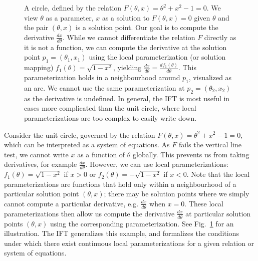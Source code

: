 \documentclass[11pt]{article}
\begin{document}
\begin{figure}
\centering
{}
\caption{
\label{fig:circle}
A circle, defined by the relation $F(\theta,x) = \theta^2 + x^2 - 1 = 0$.
We view $\theta$ as a parameter, $x$ as a solution to $F(\theta,x)=0$ given $\theta$
and the pair $(\theta,x)$ is a solution point.
Our goal is to compute the derivative $\frac{dx}{d\theta}$.
While we cannot differentiate the relation $F$ directly as it is not a function,
we can compute the derivative at the solution point $p_1 = (\theta_1,x_1)$
using the local parameterization (or solution mapping) $f_1(\theta)=\sqrt{1-x^2}$,
yielding $\frac{dx}{d\theta}= \frac{df_1(\theta)}{d\theta}$.
This parameterization holds
in a neighbourhood around $p_1$, visualized as an arc.
We cannot use the same parameterization at $p_2 = (\theta_2, x_2)$ as the derivative is undefined.
In general, the IFT is most useful in cases more complicated than the unit circle,
where local parameterizations are too complex to easily write down.
}
\end{figure}

Consider the unit circle,
governed by the relation $F(\theta,x) = \theta^2 + x^2 - 1 = 0$,
which can be interpreted as a system of equations.
As $F$ fails the vertical line test, we cannot write $x$ as a function of $\theta$ globally.
This prevents us from taking derivatives, for example $\frac{dx}{d\theta}$.
However, we can use local parameterizations: $f_1(\theta) = \sqrt{1-x^2}$ if $x > 0$
or $f_2(\theta) = -\sqrt{1-x^2}$ if $x<0$.
Note that the local parameterizations are functions that hold
only within a neighbourhood of a particular solution point $(\theta,x)$;
there may be solution points where we simply cannot compute a particular derivative,
e.g. $\frac{dx}{d\theta}$ when $x=0$.
These local parameterizations then allow us compute the derivative $\frac{dx}{d\theta}$
at particular solution points $(\theta,x)$ using the corresponding parameterization.
See Fig.~\ref{fig:circle} for an illustration.
The IFT generalizes this example, and formalizes the conditions under which there exist
continuous local parameterizations for a given relation or system of equations.
\end{document}
